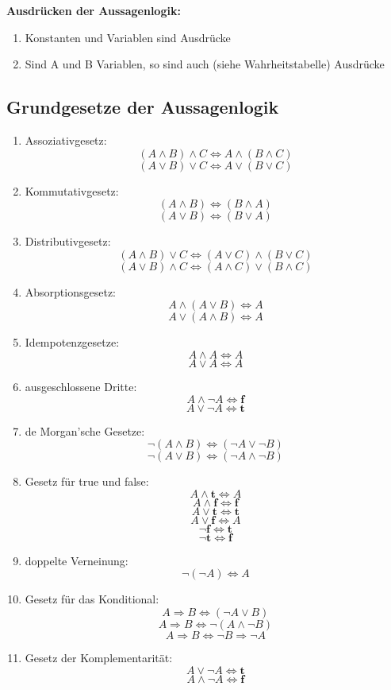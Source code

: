 \documentclass[12pt,a4paper,titlepage]{article} %
\theoremstyle{definition}
\theoremstyle{remark}
\begin{document}
	\textbf{Ausdrücken der Aussagenlogik:}
	\begin{enumerate}
		\item Konstanten und Variablen sind Ausdrücke
		\item Sind A und B Variablen, so sind auch (siehe Wahrheitstabelle) Ausdrücke
	\end{enumerate}
	\subsection{Grundgesetze der Aussagenlogik}
	\begin{enumerate}
		\item Assoziativgesetz:
		\[(A \wedge B) \wedge C \Leftrightarrow A \wedge (B \wedge C)\]
		\[(A \vee B) \vee C \Leftrightarrow A \vee (B \vee C)\]
		\item Kommutativgesetz:
		\[(A \wedge B) \Leftrightarrow (B \wedge A)\]
		\[(A \vee B) \Leftrightarrow (B \vee A)\]
		\item Distributivgesetz:
		\[(A \wedge B) \vee C \Leftrightarrow (A \vee C) \wedge (B \vee C)\]
		\[(A \vee B) \wedge C \Leftrightarrow (A \wedge C) \vee (B \wedge C)\]
		\item Absorptionsgesetz:
		\[A \wedge (A \vee B) \Leftrightarrow A\]
		\[A \vee (A \wedge B) \Leftrightarrow A\]
		\item Idempotenzgesetze:
		\[A \wedge A \Leftrightarrow A\]
		\[A \vee A \Leftrightarrow A\]
		\item ausgeschlossene Dritte:
		\[A \wedge \neg A \Leftrightarrow \textbf{f}\]
		\[A \vee \neg A \Leftrightarrow \textbf{t}\]
		\item de Morgan'sche Gesetze:
		\[\neg (A \wedge B) \Leftrightarrow (\neg A \vee \neg B)\]
		\[\neg (A \vee B) \Leftrightarrow (\neg A \wedge \neg B)\]
		\item Gesetz für true und false:
		\[A \wedge \textbf{t} \Leftrightarrow A\]
		\[A \wedge \textbf{f} \Leftrightarrow \textbf{f}\]
		\[A \vee \textbf{t} \Leftrightarrow \textbf{t}\]
		\[A \vee \textbf{f} \Leftrightarrow A\]
		\[\neg \textbf{f} \Leftrightarrow \textbf{t}\]
		\[\neg \textbf{t} \Leftrightarrow \textbf{f}\]
		\item doppelte Verneinung:
		\[\neg (\neg A) \Leftrightarrow A\]
		\item Gesetz für das Konditional:
		\[A \Rightarrow B \Leftrightarrow (\neg A \vee B)\]
		\[A \Rightarrow B \Leftrightarrow \neg (A \wedge \neg B)\]
		\[A \Rightarrow B \Leftrightarrow \neg B \Rightarrow \neg A\]
		\item Gesetz der Komplementarität:
		\[A \vee \neg A \Leftrightarrow \textbf{t}\]
		\[A \wedge \neg A \Leftrightarrow \textbf{f}\]
	\end{enumerate}	
\end{document}
